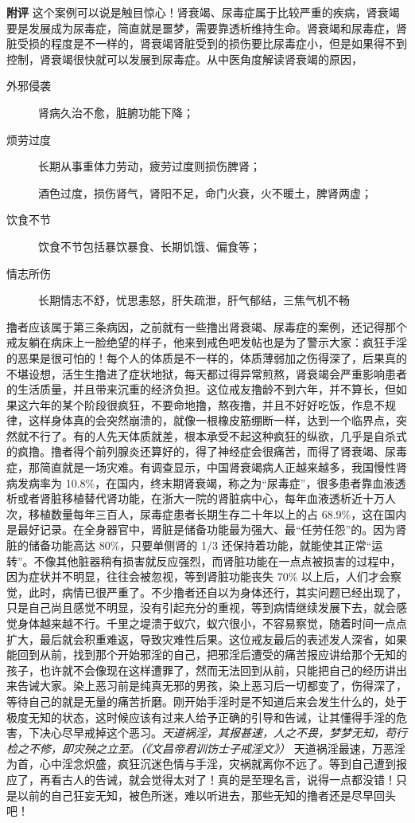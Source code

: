 \begin{case}
    \textbf{附评} 这个案例可以说是触目惊心！肾衰竭、尿毒症属于比较严重的疾病，肾衰竭要是发展成为尿毒症，简直就是噩梦，需要靠透析维持生命。肾衰竭和尿毒症，肾脏受损的程度是不一样的，肾衰竭肾脏受到的损伤要比尿毒症小，但是如果得不到控制，肾衰竭很快就可以发展到尿毒症。从中医角度解读肾衰竭的原因，\begin{description}
        \item[外邪侵袭] 肾病久治不愈，脏腑功能下降；
        \item[烦劳过度] 长期从事重体力劳动，疲劳过度则损伤脾肾；
        \item[] 酒色过度，损伤肾气，肾阳不足，命门火衰，火不暖土，脾肾两虚；
        \item[饮食不节] 饮食不节包括暴饮暴食、长期饥饿、偏食等；
        \item[情志所伤] 长期情志不舒，忧思恚怒，肝失疏泄，肝气郁结，三焦气机不畅
    \end{description} 撸者应该属于第三条病因，之前就有一些撸出肾衰竭、尿毒症的案例，还记得那个戒友躺在病床上一脸绝望的样子，他来到戒色吧发帖也是为了警示大家：疯狂手淫的恶果是很可怕的！每个人的体质是不一样的，体质薄弱加之伤得深了，后果真的不堪设想，活生生撸进了症状地狱，每天都过得异常煎熬，肾衰竭会严重影响患者的生活质量，并且带来沉重的经济负担。这位戒友撸龄不到六年，并不算长，但如果这六年的某个阶段很疯狂，不要命地撸，熬夜撸，并且不好好吃饭，作息不规律，这样身体真的会突然崩溃的，就像一根橡皮筋绷断一样，达到一个临界点，突然就不行了。有的人先天体质就差，根本承受不起这种疯狂的纵欲，几乎是自杀式的疯撸。撸者得个前列腺炎还算好的，得了神经症会很痛苦，而得了肾衰竭、尿毒症，那简直就是一场灾难。有调查显示，中国肾衰竭病人正越来越多，我国慢性肾病发病率为 10.8\%，在国内，终末期肾衰竭，称之为“尿毒症”，很多患者靠血液透析或者肾脏移植替代肾功能，在浙大一院的肾脏病中心，每年血液透析近十万人次，移植数量每年三百人，尿毒症患者长期生存二十年以上的占 68.9\%，这在国内是最好记录。在全身器官中，肾脏是储备功能最为强大、最“任劳任怨”的。因为肾脏的储备功能高达 80\%，只要单侧肾的 1/3 还保持着功能，就能使其正常“运转”。不像其他脏器稍有损害就反应强烈，而肾脏功能在一点点被损害的过程中，因为症状并不明显，往往会被忽视，等到肾脏功能丧失 70\% 以上后，人们才会察觉，此时，病情已很严重了。不少撸者还自以为身体还行，其实问题已经出现了，只是自己尚且感觉不明显，没有引起充分的重视，等到病情继续发展下去，就会感觉身体越来越不行。千里之堤溃于蚁穴，蚁穴很小，不容易察觉，随着时间一点点扩大，最后就会积重难返，导致灾难性后果。这位戒友最后的表述发人深省，如果能回到从前，找到那个开始邪淫的自己，把邪淫后遭受的痛苦报应讲给那个无知的孩子，也许就不会像现在这样遭罪了，然而无法回到从前，只能把自己的经历讲出来告诫大家。染上恶习前是纯真无邪的男孩，染上恶习后一切都变了，伤得深了，等待自己的就是无量的痛苦折磨。刚开始手淫时是不知道后来会发生什么的，处于极度无知的状态，这时候应该有过来人给予正确的引导和告诫，让其懂得手淫的危害，下决心尽早戒掉这个恶习。\textit{天道祸淫，其报甚速，人之不畏，梦梦无知，苟行检之不修，即灾殃之立至。（《文昌帝君训饬士子戒淫文》）} 天道祸淫最速，万恶淫为首，心中淫念炽盛，疯狂沉迷色情与手淫，灾祸就离你不远了。等到自己遭到报应了，再看古人的告诫，就会觉得太对了！真的是至理名言，说得一点都没错！只是以前的自己狂妄无知，被色所迷，难以听进去，那些无知的撸者还是尽早回头吧！
\end{case}

